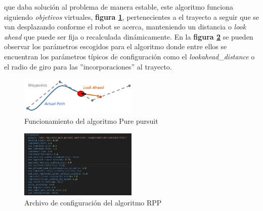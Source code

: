 que daba solución al problema de manera estable, este algoritmo funciona siguiendo \textit{objetivos} virtuales, 
\textbf{figura \ref{fig:pure_pursui_teoria}}, pertenecientes a el trayecto a seguir que se van desplazando conforme el robot se acerca, 
manteniendo un distancia o \textit{look ahead} que puede ser fija o recalculada dinámicamente. En la 
\textbf{figura \ref{fig:rpp_configuracion}} se pueden observar los parámetros escogidos para el algoritmo donde entre ellos se encuentran 
los parámetros típicos de configuración como el \textit{lookahead\_distance} o el radio de giro para las ''incorporaciones'' al trayecto.
\begin{figure}[h]
    \centering
    \includegraphics[width=0.5\textwidth]{images/pure_pursuit_teoria.png}
    \caption{Funcionamiento del algoritmo Pure pursuit}
    \label{fig:pure_pursui_teoria}
\end{figure}

\begin{figure}[H]
    \centering
    \includegraphics[width=0.5\textwidth]{images/rpp_configuration.png}
    \caption{Archivo de configuración del algoritmo RPP}
    \label{fig:rpp_configuracion}
\end{figure}

